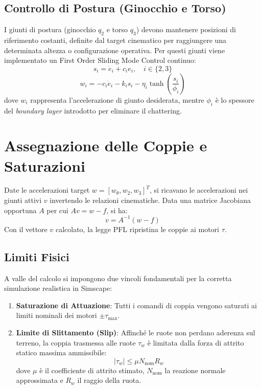\documentclass[11pt,a4paper]{article}
\begin{document}
\subsection{Controllo di Postura (Ginocchio e Torso)}
I giunti di postura (ginocchio $q_2$ e torso $q_3$) devono mantenere posizioni di riferimento costanti, definite dal target cinematico per raggiungere una determinata altezza o configurazione operativa. Per questi giunti viene implementato un First Order Sliding Mode Control continuo:
\begin{equation}
    s_i = \dot{e}_i + c_i e_i, \quad i \in \{2, 3\}
\end{equation}
\begin{equation}
    w_i = -c_i \dot{e}_i - k_i s_i - \eta_i \tanh\left(\frac{s_i}{\phi_i}\right)
\end{equation}
dove $w_i$ rappresenta l'accelerazione di giunto desiderata, mentre $\phi_i$ è lo spessore del \textit{boundary layer} introdotto per eliminare il chattering.

\section{Assegnazione delle Coppie e Saturazioni}

Date le accelerazioni target $w = [w_\theta, w_2, w_3]^T$, si ricavano le accelerazioni nei giunti attivi $v$ invertendo le relazioni cinematiche. Data una matrice Jacobiana opportuna $A$ per cui $A v = w - f$, si ha:
\begin{equation}
    v = A^{-1} (w - f)
\end{equation}
Con il vettore $v$ calcolato, la legge PFL ripristina le coppie ai motori $\tau$. 

\subsection{Limiti Fisici}
A valle del calcolo si impongono due vincoli fondamentali per la corretta simulazione realistica in Simscape:
\begin{enumerate}
    \item \textbf{Saturazione di Attuazione}: Tutti i comandi di coppia vengono saturati ai limiti nominali dei motori $\pm \tau_{\max}$.
    \item \textbf{Limite di Slittamento (Slip)}: Affinché le ruote non perdano aderenza sul terreno, la coppia trasmessa alle ruote $\tau_w$ è limitata dalla forza di attrito statico massima ammissibile:
    \begin{equation}
        |\tau_w| \leq \mu N_{\text{nom}} R_w
    \end{equation}
    dove $\mu$ è il coefficiente di attrito stimato, $N_{\text{nom}}$ la reazione normale approssimata e $R_w$ il raggio della ruota.
\end{enumerate}
\end{document}
